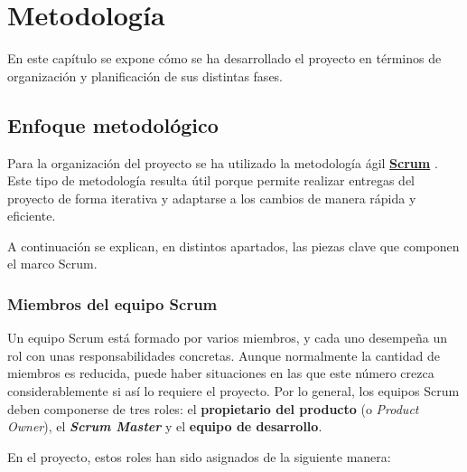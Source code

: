 \chapter{Metodología}

En este capítulo se expone cómo se ha desarrollado el proyecto en términos de organización y planificación de sus distintas fases.

\section{Enfoque metodológico}

Para la organización del proyecto se ha utilizado la metodología ágil \hyperlink{scrum}{\textbf{Scrum}} \cite{scrum}.
Este tipo de metodología resulta útil porque permite realizar entregas del proyecto de forma iterativa y adaptarse a los cambios de manera rápida y eficiente.

A continuación se explican, en distintos apartados, las piezas clave que componen el marco Scrum.

\subsection{Miembros del equipo Scrum}

Un equipo Scrum está formado por varios miembros, y cada uno desempeña un rol con unas responsabilidades concretas.
Aunque normalmente la cantidad de miembros es reducida, puede haber situaciones en las que este número crezca considerablemente
si así lo requiere el proyecto. Por lo general, los equipos Scrum deben componerse de tres roles: el \textbf{propietario
del producto} (o \textit{Product Owner}), el \textbf{\textit{Scrum Master}} y el \textbf{equipo de desarrollo}.

En el proyecto, estos roles han sido asignados de la siguiente manera:

